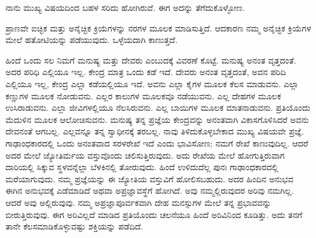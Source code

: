 ನಾನು ಮುಖ್ಯ ವಿಷಯದಿಂದ ಬಹಳ ಸರಿದು ಹೋಗಿರುವೆ. ಈಗ ಅದನ್ನು ತೆಗೆದುಕೊಳ್ಳೋಣ.

ಪ್ರಾಣವೇ ಐಚ್ಛಿಕ ಮತ್ತು ಅನೈಚ್ಛಿಕ ಕ್ರಿಯೆಗಳನ್ನು ನರಗಳ ಮೂಲಕ ಮಾಡಿಸುತ್ತಿದೆ. ಆದಕಾರಣ ನಮ್ಮ ಅನೈಚ್ಛಿಕ ಕ್ರಿಯೆಗಳ ಮೇಲೆ ಹತೋಟಿಯನ್ನು ಪಡೆಯುವುದು. ಒಳ್ಳೆಯದಾಗಿ ಕಾಣುತ್ತದೆ.

ಹಿಂದೆ ಒಂದು ಸಲ ನಿಮಗೆ ಮನುಷ್ಯ ಮತ್ತು ದೇವರು ಎಂಬುದಕ್ಕೆ ವಿವರಣೆ ಕೊಟ್ಟೆ. ಮನುಷ್ಯ ಅನಂತ ವೃತ್ತದಂತೆ. ಅದರ ಪರಿಧಿ ಎಲ್ಲಿಯೂ ಇಲ್ಲ. ಕೇಂದ್ರ ಮಾತ್ರ ಒಂದು ಕಡೆ ಇದೆ. ದೇವರು ಅನಂತ ವೃತ್ತದಂತೆ, ಅವನ ಪರಿದಿ ಎಲ್ಲಿಯೂ ಇಲ್ಲ, ಕೇಂದ್ರ ಎಲ್ಲಾ ಕಡೆಯಲ್ಲಿಯೂ ಇದೆ. ಅವನು ಎಲ್ಲಾ ಕೈಗಳ ಮೂಲಕ ಕೆಲಸ ಮಾಡುವನು. ಎಲ್ಲಾ ಕಣ್ಣುಗಳ ಮೂಲಕ ನೋಡುವನು. ಎಲ್ಲರ ಕಾಲುಗಳ ಮೂಲಕವೂ ನಡೆಯುವನು. ಎಲ್ಲ ದೇಹಗಳ ಮೂಲಕ ಉಸಿರಾಡುವನು. ಎಲ್ಲಾ ಜೀವಿಗಳಲ್ಲಿಯೂ ನೆಲಸಿರುವನು. ಎಲ್ಲ ಬಾಯಿಗಳ ಮೂಲಕ ಮಾತನಾಡುವನು. ಪ್ರತಿಯೊಂದು ಮೆದುಳಿನ ಮೂಲಕ ಆಲೋಚಿಸುವನು. ಮನುಷ್ಯ ತನ್ನ ಪ್ರಜ್ಞೆಯ ಕೇಂದ್ರವನ್ನು ಅನಂತವಾಗಿ ವಿಕಾಸಗೊಳಿಸಿದರೆ ಅವನು ದೇವನಂತೆ ಆಗಬಲ್ಲ. ಎಲ್ಲವನ್ನೂ ತನ್ನ ಸ್ವಾಧೀನಕ್ಕೆ ತರಬಲ್ಲ. ನಾವು ತಿಳಿದುಕೊಳ್ಳಬೇಕಾದ ಮುಖ್ಯ ವಿಷಯವೇ ಪ್ರಜ್ಞೆ. ಗಾಢಾಂಧಕಾರದಲ್ಲಿ ಒಂದು ಅನಂತವಾದ ಸರಳರೇಖೆ ಇದೆ ಎಂದು ಭಾವಿಸೋಣ; ನಮಗೆ ರೇಖೆ ಕಾಣುವುದಿಲ್ಲ. ಆದರೆ ಅದರ ಮೇಲೆ ಜ್ಯೋತಿರ್ಮಯ ವಸ್ತುವೊಂದು ಚಲಿಸುತ್ತಿರುವುದು. ಅದು ರೇಖೆಯ ಮೇಲೆ ಹೋಗುತ್ತಿರುವಾಗ ದಾರಿಯಲ್ಲಿ ಸಿಕ್ಕುವ ಸ್ಥಳವನ್ನೆಲ್ಲಾ ಬೆಳಕಿನಲ್ಲಿ ತೋರುವುದು. ಹಿಂದೆ ಉಳಿದುದೆಲ್ಲ ಪುನಃ ಗಾಢಾಂಧಕಾರದಲ್ಲಿ ಮರೆಯಾಗುವುದು. ನಮ್ಮ ಪ್ರಜ್ಞೆಯನ್ನು ಈ ಜ್ಯೋತಿಯ ವಸ್ತುವಿಗೆ ಹೋಲಿಸಬಹುದು. ಅದರ ಹಿಂದಿನ ಅನುಭವ ಈಗಿನ ಅನುಭವಕ್ಕೆ ಎಡೆಮಾಡಿದೆ ಅಥವಾ ಅಪ್ರಜ್ಞಾವಸ್ಥೆಗೆ ಹೋಗಿದೆ. ಅವು ನಮ್ಮಲ್ಲಿರುವುದರ ಅರಿವು ನಮಗಿಲ್ಲ. ಆದರೆ ಅವು ಅಲ್ಲಿರುವುವು. ನಮ್ಮ ಅಪ್ರಜ್ಞಾಪೂರ್ವಕವಾಗಿ ದೇಹ ಮನಸ್ಸುಗಳ ಮೇಲೆ ತನ್ನ ಪ್ರಭಾವವನ್ನು ಬೀರುತ್ತಿರುವುವು. ಈಗ ಅರಿವಿಲ್ಲದೆ ಮಾಡಿದ ಪ್ರತಿಯೊಂದು ಚಲನೆಯೂ ಹಿಂದೆ ಅರಿವಿನಿಂದ ಕೂಡಿತ್ತು. ಅದು ತನಗೆ ತಾನೇ ಕೆಲಸಮಾಡಿಕೊಳ್ಳುವಷ್ಟು ಶಕ್ತಿಯನ್ನು ಪಡೆದಿದೆ.

